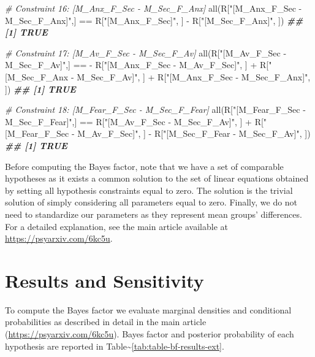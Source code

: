 \documentclass[
]{book}
\newenvironment{Shaded}{\begin{snugshade}}{\end{snugshade}}
\newcommand{\CommentTok}[1]{\textcolor[rgb]{0.56,0.35,0.01}{\textit{#1}}}
\newcommand{\DocumentationTok}[1]{\textcolor[rgb]{0.56,0.35,0.01}{\textbf{\textit{#1}}}}
\newcommand{\FunctionTok}[1]{\textcolor[rgb]{0.00,0.00,0.00}{#1}}
\newcommand{\NormalTok}[1]{#1}
\newcommand{\SpecialCharTok}[1]{\textcolor[rgb]{0.00,0.00,0.00}{#1}}
\newcommand{\StringTok}[1]{\textcolor[rgb]{0.31,0.60,0.02}{#1}}
\begin{document}
\begin{Shaded}
\begin{Highlighting}[]
\CommentTok{\# Constraint 16: [M\_Anx\_F\_Sec {-} M\_Sec\_F\_Anx]}
\FunctionTok{all}\NormalTok{(R[}\StringTok{"[M\_Anx\_F\_Sec {-} M\_Sec\_F\_Anx]"}\NormalTok{,] }\SpecialCharTok{==}\NormalTok{ R[}\StringTok{"[M\_Anx\_F\_Sec]"}\NormalTok{, ] }\SpecialCharTok{{-}}\NormalTok{ R[}\StringTok{"[M\_Sec\_F\_Anx]"}\NormalTok{, ])}
\DocumentationTok{\#\# [1] TRUE}

\CommentTok{\# Constraint 17: [M\_Av\_F\_Sec {-} M\_Sec\_F\_Av]}
\FunctionTok{all}\NormalTok{(R[}\StringTok{"[M\_Av\_F\_Sec {-} M\_Sec\_F\_Av]"}\NormalTok{,] }\SpecialCharTok{==} \SpecialCharTok{{-}}\NormalTok{ R[}\StringTok{"[M\_Anx\_F\_Sec {-} M\_Av\_F\_Sec]"}\NormalTok{, ] }\SpecialCharTok{+}\NormalTok{ R[}\StringTok{"[M\_Sec\_F\_Anx {-} M\_Sec\_F\_Av]"}\NormalTok{, ] }\SpecialCharTok{+}\NormalTok{  R[}\StringTok{"[M\_Anx\_F\_Sec {-} M\_Sec\_F\_Anx]"}\NormalTok{, ])}
\DocumentationTok{\#\# [1] TRUE}

\CommentTok{\# Constraint 18: [M\_Fear\_F\_Sec {-} M\_Sec\_F\_Fear] }
\FunctionTok{all}\NormalTok{(R[}\StringTok{"[M\_Fear\_F\_Sec {-} M\_Sec\_F\_Fear]"}\NormalTok{,] }\SpecialCharTok{==}\NormalTok{ R[}\StringTok{"[M\_Av\_F\_Sec {-} M\_Sec\_F\_Av]"}\NormalTok{, ] }\SpecialCharTok{+}\NormalTok{ R[}\StringTok{"[M\_Fear\_F\_Sec {-} M\_Av\_F\_Sec]"}\NormalTok{, ] }\SpecialCharTok{{-}}\NormalTok{ R[}\StringTok{"[M\_Sec\_F\_Fear {-} M\_Sec\_F\_Av]"}\NormalTok{, ])}
\DocumentationTok{\#\# [1] TRUE}
\end{Highlighting}
\end{Shaded}

Before computing the Bayes factor, note that we have a set of comparable hypotheses as it exists a common solution to the set of linear equations obtained by setting all hypothesis constraints equal to zero. The solution is the trivial solution of simply considering all parameters equal to zero. Finally, we do not need to standardize our parameters as they represent mean groups' differences. For a detailed explanation, see the main article available at \url{https://psyarxiv.com/6kc5u}.

\hypertarget{results-and-sensitivity}{%
\section{Results and Sensitivity}\label{results-and-sensitivity}}

To compute the Bayes factor we evaluate marginal densities and conditional probabilities as described in detail in the main article (\url{https://psyarxiv.com/6kc5u}). Bayes factor and posterior probability of each hypothesis are reported in Table\textasciitilde\ref{tab:table-bf-results-ext}.
\end{document}
